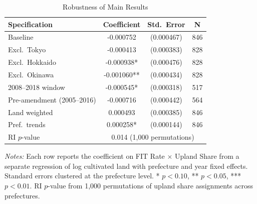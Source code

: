 \begin{table}[H]
\centering
\caption{Robustness of Main Results}
\begin{threeparttable}
\begin{tabular}{lccc}
\toprule
Specification & Coefficient & Std.\ Error & N \\
\midrule
Baseline & -0.000752 & (0.000467) & 846 \\
Excl.\ Tokyo & -0.000413 & (0.000383) & 828 \\
Excl.\ Hokkaido & -0.000938* & (0.000476) & 828 \\
Excl.\ Okinawa & -0.001060** & (0.000434) & 828 \\
2008--2018 window & -0.000545* & (0.000318) & 517 \\
Pre-amendment (2005--2016) & -0.000716 & (0.000442) & 564 \\
Land weighted & 0.000493 & (0.000385) & 846 \\
Pref.\ trends & 0.000258* & (0.000144) & 846 \\
\addlinespace
RI $p$-value & \multicolumn{3}{c}{0.014 (1,000 permutations)} \\
\bottomrule
\end{tabular}
\begin{tablenotes}[flushleft]
\small
\item \textit{Notes:} Each row reports the coefficient on FIT Rate $\times$ Upland Share from a separate regression of log cultivated land with prefecture and year fixed effects. Standard errors clustered at the prefecture level. * $p<0.10$, ** $p<0.05$, *** $p<0.01$. RI $p$-value from 1,000 permutations of upland share assignments across prefectures.
\end{tablenotes}
\end{threeparttable}
\label{tab:robustness}
\end{table}

